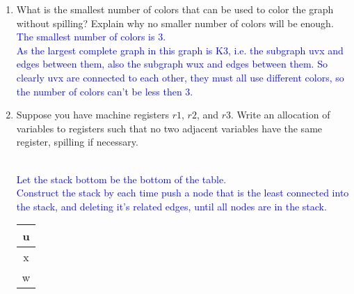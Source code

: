 \documentclass[10pt]{article}
\begin{document}
\begin{enumerate}
\begin{enumerate}
                \textcolor{blue}{\\
                }
          \item What is the smallest number of colors that can be used to color the graph without spilling?
                Explain why no smaller number of colors will be enough.
                \textcolor{blue}{\\
                  The smallest number of colors is 3.\\
                  As the largest complete graph in this graph is K3, i.e. the subgraph uvx and edges between them, also the subgraph wux and edges between them. So clearly uvx are connected to each other, they must all use different colors, so the number of colors can't be less then 3.
                }
          \item Suppose you have machine registers $r1$, $r2$, and $r3$. Write an allocation of variables to
                registers such that no two adjacent variables have the same register, spilling if necessary.
                \textcolor{blue}{\\
                  Let the stack bottom be the bottom of the table.\\
                  Construct the stack by each time push a node that is the least connected into the stack, and deleting it's related edges, until all nodes are in the stack.\\
                  \begin{tabular}{|c|}
                    \\
                    \hline
                    u \\
                    \hline
                    x \\
                    \hline
                    w \\

\end{tabular}}
\end{enumerate}
\end{enumerate}
\end{document}
